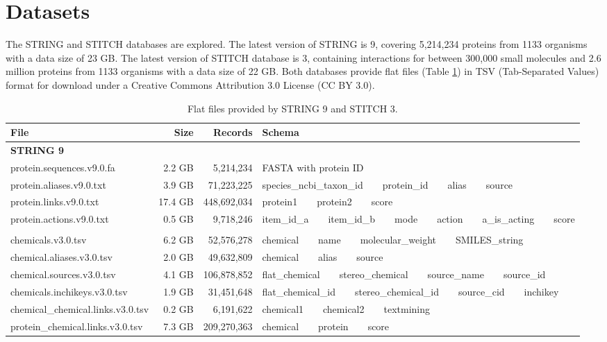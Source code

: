\documentclass[10pt,conference,compsocconf]{../IEEEtran}
\begin{document}
\section{Datasets}

The STRING and STITCH databases are explored. The latest version of STRING is 9, covering 5,214,234 proteins from 1133 organisms with a data size of 23 GB. The latest version of STITCH database is 3, containing interactions for between 300,000 small molecules and 2.6 million proteins from 1133 organisms with a data size of 22 GB. Both databases provide flat files (Table \ref{tab:datasets}) in TSV (Tab-Separated Values) format for download under a Creative Commons Attribution 3.0 License (CC BY 3.0).

\begin{table}
\centering
\begin{tabular*}
{\linewidth}
{@{\extracolsep{\fill}}lrrl}
\toprule
File & Size & Records & Schema\\
\midrule
\multicolumn{4}{l}{\textbf{STRING 9}}\\
protein.sequences.v9.0.fa &  2.2 GB &   5,214,234 & FASTA with protein ID\\
protein.aliases.v9.0.txt  &  3.9 GB &  71,223,225 & species\_ncbi\_taxon\_id\ \ \ \ protein\_id\ \ \ \ alias\ \ \ \ source\\
protein.links.v9.0.txt    & 17.4 GB & 448,692,034 & protein1\ \ \ \ protein2\ \ \ \ score\\
protein.actions.v9.0.txt  &  0.5 GB &   9,718,246 & item\_id\_a\ \ \ \ item\_id\_b\ \ \ \ mode\ \ \ \ action\ \ \ \ a\_is\_acting\ \ \ \ score\\
\noalign{\smallskip\smallskip}
\multicolumn{4}{l}{\textbf{STITCH 3}}\\
chemicals.v3.0.tsv                & 6.2 GB &  52,576,278 & chemical\ \ \ \ name\ \ \ \ molecular\_weight\ \ \ \ SMILES\_string\\
chemical.aliases.v3.0.tsv         & 2.0 GB &  49,632,809 & chemical\ \ \ \ alias\ \ \ \ source\\
chemical.sources.v3.0.tsv         & 4.1 GB & 106,878,852 & flat\_chemical\ \ \ \ stereo\_chemical\ \ \ \ source\_name\ \ \ \ source\_id\\
chemicals.inchikeys.v3.0.tsv      & 1.9 GB &  31,451,648 & flat\_chemical\_id\ \ \ \ stereo\_chemical\_id\ \ \ \ source\_cid\ \ \ \ inchikey\\
chemical\_chemical.links.v3.0.tsv & 0.2 GB &   6,191,622 & chemical1\ \ \ \ chemical2\ \ \ \ textmining\\
protein\_chemical.links.v3.0.tsv  & 7.3 GB & 209,270,363 & chemical\ \ \ \ protein\ \ \ \ score\\
\bottomrule
\end{tabular*}
\caption{Flat files provided by STRING 9 and STITCH 3.}
\label{tab:datasets}
\end{table}
\end{document}
